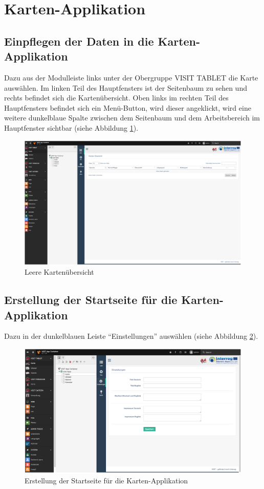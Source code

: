 \section{Karten-Applikation}

\subsection{Einpflegen der Daten in die Karten-Applikation}

Dazu aus der Modulleiste links unter der Obergruppe VISIT TABLET die Karte auswählen. Im linken Teil des Hauptfensters ist der Seitenbaum zu sehen und rechts befindet sich die Kartenübersicht. Oben links im rechten Teil des Hauptfensters befindet sich ein Menü-Button, wird dieser angeklickt, wird eine weitere dunkelblaue Spalte zwischen dem Seitenbaum und dem Arbeitsbereich im Hauptfenster sichtbar (siehe Abbildung \ref{img:kartenapp}).

\begin{figure}[ht!]
\centering
\includegraphics[width=12cm]{Figures/paula/karte/kartenapp.png}
\caption{Leere Kartenübersicht}
\label{img:kartenapp}
\end{figure}

\subsection{Erstellung der Startseite für die Karten-Applikation}

Dazu in der dunkelblauen Leiste “Einstellungen” auswählen (siehe Abbildung \ref{img:startseite_karte}).

\begin{figure}[ht!]
\centering
\includegraphics[width=12cm]{Figures/paula/karte/startseite_karte.png}
\caption{Erstellung der Startseite für die Karten-Applikation}
\label{img:startseite_karte}
\end{figure}

